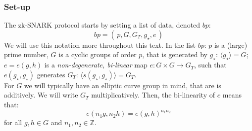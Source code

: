 \documentclass[11pt,oneside]{article}
\newcommand{\be}{\begin{equation}}
\newcommand{\ee}{\end{equation}}
\theoremstyle{definition}
\theoremstyle{remark}
\numberwithin{equation}{section}
\begin{document}
\subsubsection{Set-up}
The zk-SNARK protocol starts by setting a list of data, denoted $bp$:
\be
bp = \left(\,p,G,G_T,g_{\star},e\,\right)
\ee
We will use this notation more throughout this text.
In the list $bp$: $p$ is a (large) prime number, $G$ is a cyclic groups of order $p$, that is generated by $g_\star$: $\langle g_\star\rangle = G$; $e=e(g,h)$ is a \emph{non-degenerate, bi-linear} map $e:G\times G\rightarrow G_T$, such that $e(g_\star,g_\star)$ generates $G_T$: $\langle s(g_\star,g_\star)\rangle = G_T$.\\
For $G$ we will typically have an elliptic curve group in mind, that are is additively. We will write $G_T$ multiplicatively. Then, the bi-linearity of $e$ means that:
\be
e(n_1 g,n_2 h)=e(g,h)^{n_1n_2}
\ee 
for all $g,h\in G$ and $n_1,n_2\in\mathbb{Z}$. \\
\newpage
\setlength{\fboxsep}{10pt}
\newline
\end{document}
